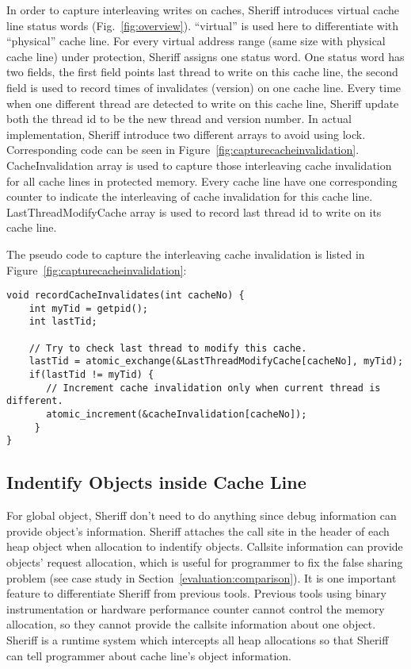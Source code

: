 In order to capture interleaving writes on caches, Sheriff introduces 
virtual cache line status words (Fig.~\ref{fig:overview}). 
``virtual'' is used here to differentiate with ``physical'' cache line. 
For every virtual address range (same size with physical cache line) under protection, Sheriff assigns one status word. 
One status word has two fields, the first field points last thread to write on this cache line, 
the second field is used to record times of invalidates (version) on one cache line. 
Every time when one different thread are detected to write on this cache line, Sheriff update both the thread id
to be the new thread and version number. 
In actual implementation, Sheriff introduce two different arrays to avoid using lock. Corresponding code can be seen
in Figure~\ref{fig:capturecacheinvalidation}.
CacheInvalidation array is used to capture those interleaving cache invalidation for all cache lines in protected memory. 
Every cache line have one corresponding counter to indicate the interleaving of cache invalidation for this cache line. 
LastThreadModifyCache array is used to record last thread id to write on its cache line. 

The pseudo code to capture the interleaving cache invalidation is listed in Figure~\ref{fig:capturecacheinvalidation}:
\begin{figure*}[!t]
\begin{lstlisting}
void recordCacheInvalidates(int cacheNo) {
    int myTid = getpid();
    int lastTid;

    // Try to check last thread to modify this cache.
    lastTid = atomic_exchange(&LastThreadModifyCache[cacheNo], myTid);
    if(lastTid != myTid) {
       // Increment cache invalidation only when current thread is different.
       atomic_increment(&cacheInvalidation[cacheNo]);
     }
}
\end{lstlisting}
\caption{Record the cache invalidation atomically.\label{fig:capturecacheinvalidation}}
\end{figure*}

\subsection{Indentify Objects inside Cache Line}
\label{detection:object}
For global object, Sheriff don't need to do anything since debug information can provide
object's information.
Sheriff attaches the call site in the header of each heap object when allocation to indentify objects.
Callsite information can provide objects' request allocation, which is useful for programmer
to fix the false sharing problem (see case study in Section~\ref{evaluation:comparison}).
It is one important feature to differentiate Sheriff from previous tools.
Previous tools using binary instrumentation or hardware performance counter cannot control
the memory allocation, so they cannot provide the callsite information about one object.
Sheriff is a runtime system which intercepts all heap allocations so that Sheriff can tell programmer
about cache line's object information.

